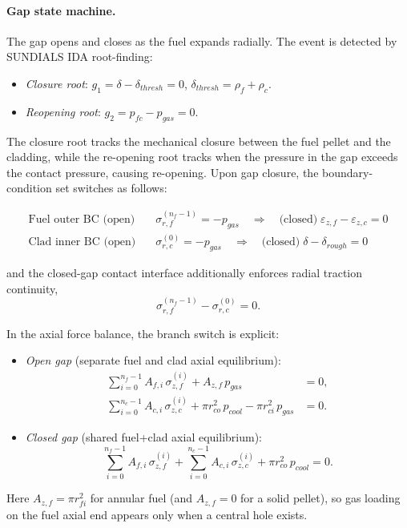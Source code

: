 \begin{refsection}
\paragraph{Gap state machine.} The gap opens and closes as the fuel expands radially.  The event is detected by SUNDIALS IDA root-finding:

\begin{itemize}
\item \emph{Closure root}: $g_1 = \delta - \delta_{thresh} = 0$, $\delta_{thresh} = \rho_f + \rho_c$.
\item \emph{Reopening root}: $g_2 = p_{fc} - p_{gas} = 0$.
\end{itemize}

The closure root tracks the mechanical closure between the fuel pellet and the cladding, while the re-opening root tracks when the pressure in the gap exceeds the contact pressure, causing re-opening. Upon gap closure, the boundary-condition set switches as follows:

\begin{align}
  \text{Fuel outer BC (open)}\quad &\sigma_{r,f}^{(n_f-1)} = -p_{gas}
  \quad\Longrightarrow\quad
  \text{(closed)}\; \varepsilon_{z,f} - \varepsilon_{z,c} = 0 \\
  \text{Clad inner BC (open)}\quad &\sigma_{r,c}^{(0)} = -p_{gas}
  \quad\Longrightarrow\quad
  \text{(closed)}\; \delta - \delta_{rough} = 0
\end{align}

and the closed-gap contact interface additionally enforces radial traction continuity,
\begin{equation}
  \sigma_{r,f}^{(n_f-1)} - \sigma_{r,c}^{(0)} = 0.
\end{equation}

In the axial force balance, the branch switch is explicit:
\begin{itemize}
\item \emph{Open gap} (separate fuel and clad axial equilibrium):
        \begin{align}
          \sum_{i=0}^{n_f-1} A_{f,i}\,\sigma_{z,f}^{(i)} + A_{z,f}\,p_{gas} &= 0, \\
          \sum_{i=0}^{n_c-1} A_{c,i}\,\sigma_{z,c}^{(i)}
          + \pi r_{co}^2\,p_{cool} - \pi r_{ci}^2\,p_{gas} &= 0.
        \end{align}
\item \emph{Closed gap} (shared fuel+clad axial equilibrium):
        \begin{equation}
          \sum_{i=0}^{n_f-1} A_{f,i}\,\sigma_{z,f}^{(i)}
          + \sum_{i=0}^{n_c-1} A_{c,i}\,\sigma_{z,c}^{(i)}
          + \pi r_{co}^2\,p_{cool} = 0.
        \end{equation}
\end{itemize}
Here $A_{z,f}=\pi r_{fi}^2$ for annular fuel (and $A_{z,f}=0$ for a solid pellet), so gas loading on the fuel axial end appears only when a central hole exists.


\end{refsection}
